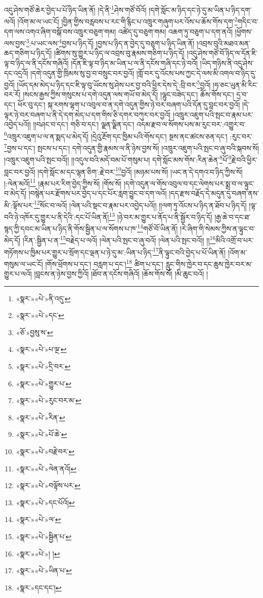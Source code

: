 འདུ་ཤེས་གཙོ་ཆེར་བྱེད་པ་པོ་ཉིད་ཡིན་ནོ། །དེ་ནི་\footnote{«སྣར་»«པེ་»ནི་འདུ་}ཤེས་གཙོ་བོའོ། །དགེ་སློང་མ་ཉིད་དང་ཉེ་དུ་མ་ཡིན་པ་ཉིད་དག་ལའོ། །འོག་མ་ལ་ཡང་ངོ། །བྱིན་གྱིས་བརླབས་པ་རང་གི་རྙིང་པ་འཁྲུར་གཞུག་པར་འོས་པ་ཆོས་གོས་དག་\footnote{«སྣར་»«པེ་»དང་}གདིང་བ་དག་ལས་འགའ་ཞིག་བསྒོ་བས་འཁྲུར་བཅུག་གམ། འཚེད་དུ་བཅུག་གམ། འཆག་ཏུ་བཅུག་པ་དག་ནའོ། །ཕྱོགས་ལས་བྱས་\footnote{«ཅོ་»བྱསུ་ས་}:པ་ཡང་ལས་\footnote{«སྣར་»«པེ་»པ་ལྔ་}བྱས་པ་ཉིད་དོ། །བྱས་པ་ཉིད་ན་བྱེད་དུ་བཅུག་པ་ཉིད་ཡིན་ནོ། །འབྲས་བུའི་མཐའ་མན་ཆད་གཅིག་པ་ཉིད་དོ། །ཚིགས་སུ་གྱུར་པ་ཉིད་ལ་འབྲས་བུ་རྣམས་གཅིག་པ་ཉིད་དོ། །འདུ་ཤེས་གཙོ་བོ་ཉིད་ལ་དོན་ཇི་ལྟ་བ་ཉིད་ལ་ནི་དངོས་གཞིའོ། །དོན་ཇི་ལྟ་བ་ཉིད་མ་ཡིན་པ་ལ་ནི་དངོས་གཞི་དང་ཉེ་བའོ། །ཡིད་གཉིས་ནི་འདུ་ཤེས་དང་འདྲའོ། །དགེ་འདུན་གྱི་ཁྲིམས་སུ་བྱ་བ་བསྲུང་བར་བྱའོ། །གློ་བར་དུ་འོངས་པས་ཀྱང་དེ་ལས་མི་འགལ་བ་ཉིད་དུ་བྱའོ། །ཡོད་དམ་མེད་པ་ཉིད་དང་ཇི་ལྟ་བུ་ཡོངས་སུ་ཤེས་པར་བྱ་བའི་ཕྱིར་དེས་དེ་:བྲི་བར་\footnote{«སྣར་»«པེ་»དྲི་བར་}བྱའོ། །ཧ་ཅང་ཡུན་མི་རིང་བར་རོ། །སངས་རྒྱས་ཀྱིས་གསུངས་པ་དགེ་འདུན་ལས་གཡོ་བ་མེད་དོ། །ལྷུང་བཟེད་དང་། ཆོས་གོས་དང་། དྲ་བ་དང་། ཕོར་བུ་དང་། སྐ་རགས་ལྷག་པ་འབུལ་བ་ན་དགེ་འདུན་གྱིས་ཉེ་བར་བཞག་པའི་དོན་དུ་བླང་བར་བྱའོ། །དེ་ལྟར་ཉེ་བར་བཞག་པ་ནི་དེ་དག་མེད་པ་དག་གིས་ཅི་དགར་བཀུར་བར་བྱའོ། །འཁྲུར་འཇུག་པའི་སྤང་བ་རྣམ་པར་འབྱེད་པའོ།། །།བཤང་བ་དང་། གཅི་བ་དང་། ལྗན་ལྗིན་དང་། འདམ་རྫབ་ལ་སོགས་པས་མ་རུང་བར་:འགྱུར་བ་\footnote{«སྣར་»«པེ་»གྱུར་པ་}འཁྲུར་འཇུག་པ་ལ་ན་སྨད་པ་མེད་དོ། །དྲེའུ་རྔོག་དང་ཁྱིམ་པའི་གོས་དང་། སྔས་ནང་ཚངས་ཅན་དང་། :རུང་བར་\footnote{«སྣར་»«པེ་»རུང་བར་མ་}བྱས་པ་དང་། སྤངས་པ་དང་། དགེ་འདུན་གྱི་རྣམས་ལ་ནི་ཉེས་བྱས་སོ། །འཁྲུར་འཇུག་པའི་སྤང་བ་ཞུ་བའི་སྐབས་སོ། །འཁྲུར་འཇུག་པའི་སྤང་བའོ།། །།འདུལ་བའི་མདོ་བམ་པོ་གསུམ་པ། དགེ་སློང་མས་གོས་:རིན་ཆེན་\footnote{«སྣར་»«པེ་»རིན་}པོ་\footnote{«སྣར་»«པེ་»པོ་ཆེ་}རྗེ་བའི་ཕྱིར་བླང་བར་བྱའོ། །དགེ་སློང་མ་དང་ལྷན་ཅིག་:རྗེ་བར་\footnote{«སྣར་»«པེ་»བརྗེ་བར་}བྱའོ། །མཉམ་པས་སོ། །ཡང་ན་དེ་དགའ་བ་ཉིད་ཀྱིས་སོ། །:ལེན་མའོ།\footnote{«སྣར་»«པེ་»ལེན་ནའོ།} །རྣམ་པར་རིག་བྱེད་ཀྱིས་སོ། །གོས་སོ། །དགེ་འདུན་ལ་གོས་འབུལ་བ་དང་ལེགས་པར་སྨྲ་བ་ལ་ལྟུང་བ་མེད་དོ། །བསྙེན་པར་རྫོགས་པར་བྱེད་པ་དང་པོར་རླག་བྱུང་བ་དག་ལའོ། །དད་རྫས་བརྗོད་དེ་མདུན་དུ་བཞག་ནས་མི་:ལྟོས་པར་\footnote{«སྣར་»«པེ་»བལྟོས་པར་}སོང་བ་ལའོ། །ལེན་པའི་སྡང་བ་རྣམ་པར་འབྱེད་པའོ།། །།ལག་ཏུ་འོངས་པ་ཉིད་ན་ཐོབ་པ་ཉིད་དོ། །ལྟ་བའི་ཉེ་འཁོར་དུ་གྱུར་པ་ནི་དེའི་:དང་པོ་ཡིན་ནོ།\footnote{«སྣར་»«པེ་»དང་པོའོ།} །ཉེ་བར་མ་གྱུར་པ་ནོད་པ་ནི་སྦྱོར་བ་ཉིད་དོ། །རྒྱ་ཆེ་བ་དང་ཐ་སྙད་ཀྱི་དབང་མ་ཡིན་པ་ཉིད་ནི་གོས་སྦྱིན་པ་ལ་སོགས་པ་ཁ་\footnote{«སྣར་»«པེ་»ལ་}གཙོ་བོ་ཡིན་ནོ། །རེ་ཞིག་གི་སེམས་ཀྱིས་ན་ལྟུང་བ་མེད་དོ། །རིན་:སྦྱིན་པ་ན་\footnote{«སྣར་»«པེ་»སྦྱིན་པ་}བརྗེད་པ་ལའོ། །ལེན་པའི་སྤང་བ་ཞུ་བའོ། །ལེན་པའི་སྤང་བའོ།། །།\footnote{«སྣར་»«པེ་»། །}མིའི་འགྲོ་བ་པར་གཏོགས་པ་ཁྱིམ་པར་གྱུར་པ་སྲོག་དང་ལྡན་པ་ཉེ་དུ་མ་:ཡིན་པ་ཉིད་\footnote{«སྣར་»«པེ་»ཡིན་པ་}ནི་ལྟུང་བའི་བྱེད་པ་པོ་ཡིན་ནོ། །འོག་མ་གསུམ་ལ་ཡང་ངོ། །གོས་ཕྲོགས་པ་དང་། བརླག་པ་དང་།\footnote{«སྣར་»དང་དང་།} ཚིག་པ་དང་། རླུང་གིས་ཁྱེར་བ་དང་ཆུས་ཁྱེར་བར་མ་གྱུར་པ་ལའོ། །བླངས་ན་ཉེས་བྱས་ཀྱིའོ། །ཐོབ་ན་དངོས་གཞིའོ། །ཆོས་གོས་སོ། །མི་ཆུང་བའོ། །

